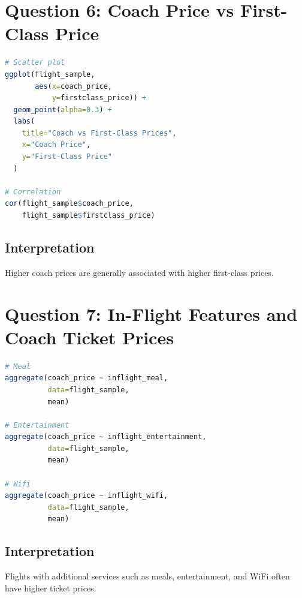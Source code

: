 \documentclass[12pt,a4paper]{article}
\begin{document}
\section{Question 6: Coach Price vs First-Class Price}

\begin{lstlisting}[language=R, caption=Coach vs First-Class Prices]
# Scatter plot
ggplot(flight_sample,
       aes(x=coach_price,
           y=firstclass_price)) +
  geom_point(alpha=0.3) +
  labs(
    title="Coach vs First-Class Prices",
    x="Coach Price",
    y="First-Class Price"
  )

# Correlation
cor(flight_sample$coach_price,
    flight_sample$firstclass_price)
\end{lstlisting}

\subsection{Interpretation}
Higher coach prices are generally associated with higher first-class prices.

\section{Question 7: In-Flight Features and Coach Ticket Prices}

\begin{lstlisting}[language=R, caption=In-Flight Features]
# Meal
aggregate(coach_price ~ inflight_meal,
          data=flight_sample,
          mean)

# Entertainment
aggregate(coach_price ~ inflight_entertainment,
          data=flight_sample,
          mean)

# Wifi
aggregate(coach_price ~ inflight_wifi,
          data=flight_sample,
          mean)
\end{lstlisting}

\subsection{Interpretation}
Flights with additional services such as meals, entertainment, and WiFi often have higher ticket prices.

\end{document}
